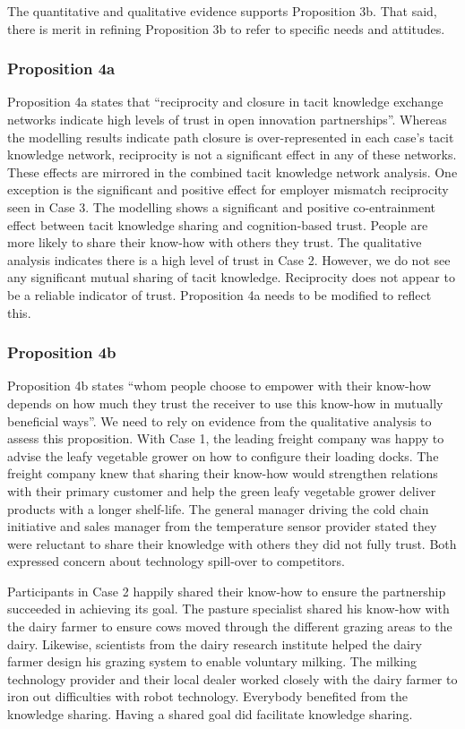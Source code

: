 The quantitative and qualitative evidence supports Proposition 3b. That said, there is merit in refining Proposition 3b to refer to specific needs and attitudes. 

\subsubsection{Proposition 4a}

Proposition 4a states that \enquote{reciprocity and closure in tacit knowledge exchange networks indicate high levels of trust in open innovation partnerships}. Whereas the modelling results indicate path closure is over-represented in each case's tacit knowledge network, reciprocity is not a significant effect in any of these networks. These effects are mirrored in the combined tacit knowledge network analysis. One exception is the significant and positive effect for employer mismatch reciprocity seen in Case 3. The modelling shows a significant and positive co-entrainment effect between tacit knowledge sharing and cognition-based trust. People are more likely to share their know-how with others they trust. The qualitative analysis indicates there is a high level of trust in Case 2. However, we do not see any significant mutual sharing of tacit knowledge. Reciprocity does not appear to be a reliable indicator of trust. Proposition 4a needs to be modified to reflect this.

\subsubsection{Proposition 4b}

Proposition 4b states \enquote{whom people choose to empower with their know-how depends on how much they trust the receiver to use this know-how in mutually beneficial ways}. We need to rely on evidence from the qualitative analysis to assess this proposition. With Case 1, the leading freight company was happy to advise the leafy vegetable grower on how to configure their loading docks. The freight company knew that sharing their know-how would strengthen relations with their primary customer and help the green leafy vegetable grower deliver products with a longer shelf-life. The general manager driving the cold chain initiative and sales manager from the temperature sensor provider stated they were reluctant to share their knowledge with others they did not fully trust. Both expressed concern about technology spill-over to competitors. \medskip

Participants in Case 2 happily shared their know-how to ensure the partnership succeeded in achieving its goal. The pasture specialist shared his know-how with the dairy farmer to ensure cows moved through the different grazing areas to the dairy. Likewise, scientists from the dairy research institute helped the dairy farmer design his grazing system to enable voluntary milking. The milking technology provider and their local dealer worked closely with the dairy farmer to iron out difficulties with robot technology. Everybody benefited from the knowledge sharing. Having a shared goal did facilitate knowledge sharing. \medskip

